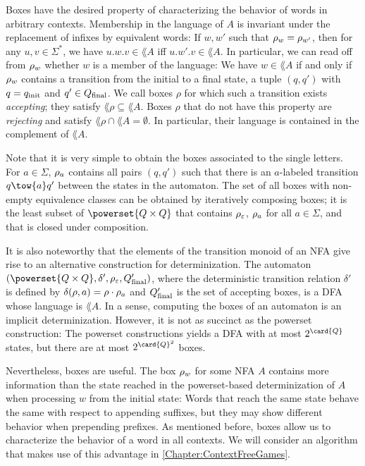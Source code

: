 \documentclass[../../diss.tex]{subfiles}
\begin{document}
Boxes have the desired property of characterizing the behavior of words in arbitrary contexts.
Membership in the language of $A$ is invariant under the replacement of infixes by equivalent words:
If $w,w'$ such that $\tbox{w} = \tbox{w'}$, then for any $u,v \in \Sigma^*$, we have $u.w.v \in \lang{A}$ iff $u.w'.v \in \lang{A}$.
%
In particular, we can read off from $\tbox{w}$ whether $w$ is a member of the language:
We have $w \in \lang{A}$ if and only if $\tbox{w}$ contains a transition from the initial to a final state, \ie a tuple $(q,q')$ with $q = q_{\text{init}}$ and $q' \in Q_{\text{final}}$.
We call boxes $\rho$ for which such a transition exists \emph{accepting}; they satisfy $\lang{\rho} \subseteq \lang{A}$.
Boxes $\rho$ that do not have this property are \emph{rejecting} and satisfy $\lang{\rho} \cap \lang{A} = \emptyset$. In particular, their language is contained in the complement of $\lang{A}$.


Note that it is very simple to obtain the boxes associated to the single letters.
For $a \in \Sigma$, $\tbox{a}$ contains all pairs $(q,q')$ such that there is an $a$-labeled transition $q \tow{a} q'$ between the states in the automaton.
The set of all boxes with non-empty equivalence classes can be obtained by iteratively composing boxes; it is the least subset of $\powerset{Q \times Q}$ that contains $\tbox{\eps}$, $\tbox{a}$ for all $a \in \Sigma$, and that is closed under composition.

It is also noteworthy that the elements of the transition monoid of an NFA give rise to an alternative construction for determinization.
The automaton $(\powerset{Q \times Q}, \delta', \tbox{\eps}, Q_\final')$, where the deterministic transition relation $\delta'$ is defined by $\delta(\rho,a) = \rho \relcomp \tbox{a}$ and $Q_{\text{final}}'$ is the set of accepting boxes, is a DFA whose language is $\lang{A}$.
In a sense, computing the boxes of an automaton is an implicit determinization.
However, it is not as succinct as the powerset construction:
The powerset constructions yields a DFA with at most $2^{\card{Q}}$ states, but there are at most $2^{\card{Q}^2}$ boxes.

Nevertheless, boxes are useful.
The box $\tbox{w}$ for some NFA $A$ contains more information than the state reached in the powerset-based determinization of $A$ when processing $w$ from the initial state:
Words that reach the same state behave the same with respect to appending suffixes, but they may show different behavior when prepending prefixes.
As mentioned before, boxes allow us to characterize  the behavior of a word in all contexts.
We will consider an algorithm that makes use of this advantage in \cref{Chapter:ContextFreeGames}.
\end{document}
